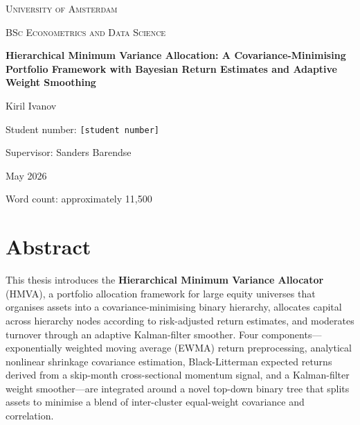 \documentclass[a4paper,12pt]{report}
\newcommand{\thesistitle}{%
  Hierarchical Minimum Variance Allocation: A Covariance-Minimising
  Portfolio Framework with Bayesian Return Estimates and Adaptive
  Weight Smoothing}
\newcommand{\authorname}{Kiril Ivanov}
\newcommand{\supervisor}{Sanders Barendse}
\newcommand{\submissiondate}{May 2026}
\newcommand{\university}{University of Amsterdam}
\newcommand{\programme}{BSc Econometrics and Data Science}
\begin{document}
\begin{titlepage}
  \centering
  \vspace*{1.5cm}
  {\scshape\LARGE \university \par}
  \vspace{0.6cm}
  {\scshape\large \programme \par}
  \vspace{2.5cm}
  {\huge\bfseries \thesistitle \par}
  \vspace{2.5cm}
  {\Large \authorname \par}
  \vspace{0.8cm}
  {\large Student number: \texttt{[student number]} \par}
  \vspace{0.8cm}
  {\large Supervisor: \supervisor \par}
  \vfill
  {\large \submissiondate \par}
  \vspace{0.5cm}
  {\small Word count: approximately 11{,}500 \par}
\end{titlepage}

\newpage
\chapter*{Abstract}

This thesis introduces the \textbf{Hierarchical Minimum Variance Allocator}
(HMVA), a portfolio allocation framework for large equity universes that
organises assets into a covariance-minimising binary hierarchy, allocates
capital across hierarchy nodes according to risk-adjusted return estimates,
and moderates turnover through an adaptive Kalman-filter smoother. Four
components---exponentially weighted moving average (EWMA) return preprocessing,
analytical nonlinear shrinkage covariance estimation, Black-Litterman expected
returns derived from a skip-month cross-sectional momentum signal, and a
Kalman-filter weight smoother---are integrated around a novel top-down binary
tree that splits assets to minimise a blend of inter-cluster equal-weight
covariance and correlation.
\end{document}
